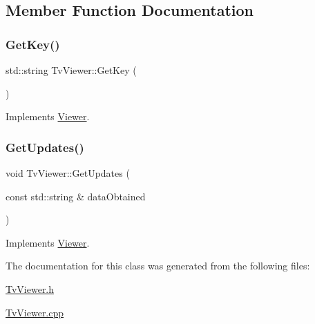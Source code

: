 \subsection{Member Function Documentation}
\mbox{\label{class_tv_viewer_ae0f96f6541d17b9a4caa81c6bfb054b2}} 
\subsubsection{\texorpdfstring{GetKey()}{GetKey()}}
{\footnotesize\ttfamily std\+::string Tv\+Viewer\+::\+Get\+Key (\begin{DoxyParamCaption}{ }\end{DoxyParamCaption})\hspace{0.3cm}{\ttfamily [virtual]}}



Implements \mbox{\hyperlink{class_viewer_a9937df0f2be6a32f2d756605dc239d1d}{Viewer}}.

\mbox{\label{class_tv_viewer_a7454005f7759194c72474f885a649e9b}} 
\subsubsection{\texorpdfstring{GetUpdates()}{GetUpdates()}}
{\footnotesize\ttfamily void Tv\+Viewer\+::\+Get\+Updates (\begin{DoxyParamCaption}\item[{const std\+::string \&}]{data\+Obtained }\end{DoxyParamCaption})\hspace{0.3cm}{\ttfamily [virtual]}}



Implements \mbox{\hyperlink{class_viewer_afc23a6059e52f018df843de22b641d83}{Viewer}}.



The documentation for this class was generated from the following files\+:\begin{DoxyCompactItemize}
\item 
\mbox{\hyperlink{_tv_viewer_8h}{Tv\+Viewer.\+h}}\item 
\mbox{\hyperlink{_tv_viewer_8cpp}{Tv\+Viewer.\+cpp}}\end{DoxyCompactItemize}
